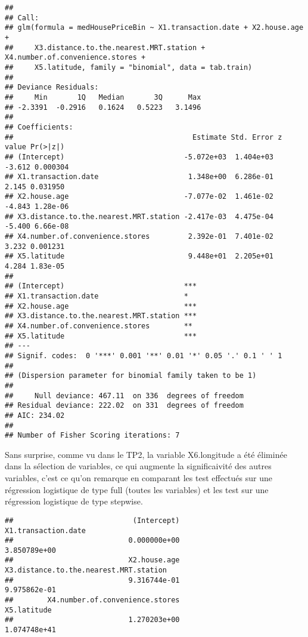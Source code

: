 \documentclass[
]{article}
\newenvironment{Shaded}{\begin{snugshade}}{\end{snugshade}}
\newcommand{\CommentTok}[1]{\textcolor[rgb]{0.56,0.35,0.01}{\textit{#1}}}
\newcommand{\KeywordTok}[1]{\textcolor[rgb]{0.13,0.29,0.53}{\textbf{#1}}}
\newcommand{\NormalTok}[1]{#1}
\newcommand{\OperatorTok}[1]{\textcolor[rgb]{0.81,0.36,0.00}{\textbf{#1}}}
\begin{document}
\begin{verbatim}
## 
## Call:
## glm(formula = medHousePriceBin ~ X1.transaction.date + X2.house.age + 
##     X3.distance.to.the.nearest.MRT.station + X4.number.of.convenience.stores + 
##     X5.latitude, family = "binomial", data = tab.train)
## 
## Deviance Residuals: 
##     Min       1Q   Median       3Q      Max  
## -2.3391  -0.2916   0.1624   0.5223   3.1496  
## 
## Coefficients:
##                                          Estimate Std. Error z value Pr(>|z|)
## (Intercept)                            -5.072e+03  1.404e+03  -3.612 0.000304
## X1.transaction.date                     1.348e+00  6.286e-01   2.145 0.031950
## X2.house.age                           -7.077e-02  1.461e-02  -4.843 1.28e-06
## X3.distance.to.the.nearest.MRT.station -2.417e-03  4.475e-04  -5.400 6.66e-08
## X4.number.of.convenience.stores         2.392e-01  7.401e-02   3.232 0.001231
## X5.latitude                             9.448e+01  2.205e+01   4.284 1.83e-05
##                                           
## (Intercept)                            ***
## X1.transaction.date                    *  
## X2.house.age                           ***
## X3.distance.to.the.nearest.MRT.station ***
## X4.number.of.convenience.stores        ** 
## X5.latitude                            ***
## ---
## Signif. codes:  0 '***' 0.001 '**' 0.01 '*' 0.05 '.' 0.1 ' ' 1
## 
## (Dispersion parameter for binomial family taken to be 1)
## 
##     Null deviance: 467.11  on 336  degrees of freedom
## Residual deviance: 222.02  on 331  degrees of freedom
## AIC: 234.02
## 
## Number of Fisher Scoring iterations: 7
\end{verbatim}

Sans surprise, comme vu dans le TP2, la variable X6.longitude a été
éliminée dans la sélection de variables, ce qui augmente la
significaivité des autres variables, c'est ce qu'on remarque en
comparant les test effectués sur une régression logistique de type full
(toutes les variables) et les test sur une régression logistique de type
stepwise.

\begin{Shaded}
\end{Shaded}

\begin{verbatim}
##                            (Intercept)                    X1.transaction.date 
##                           0.000000e+00                           3.850789e+00 
##                           X2.house.age X3.distance.to.the.nearest.MRT.station 
##                           9.316744e-01                           9.975862e-01 
##        X4.number.of.convenience.stores                            X5.latitude 
##                           1.270203e+00                           1.074748e+41
\end{verbatim}
\end{document}
